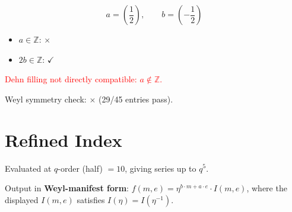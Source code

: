 \documentclass[11pt,a4paper]{article}
\begin{document}
$$a = (\frac{1}{2}), \qquad b = (-\frac{1}{2})$$

\begin{itemize}
  \item $a \in \mathbb{Z}$: $\times$
  \item $2b \in \mathbb{Z}$: $\checkmark$
\end{itemize}
\textcolor{red}{Dehn filling not directly compatible: $a \notin \mathbb{Z}$.}

Weyl symmetry check: $\times$ (29/45 entries pass).

\section{Refined Index}
Evaluated at $q$-order (half) $= 10$, giving series up to $q^{5}$.

Output in \textbf{Weyl-manifest form}: $f(m,e) = \eta^{b\cdot m + a\cdot e}\cdot I(m,e)$, where the displayed $I(m,e)$ satisfies $I(\eta) = I(\eta^{-1})$.
\end{document}
